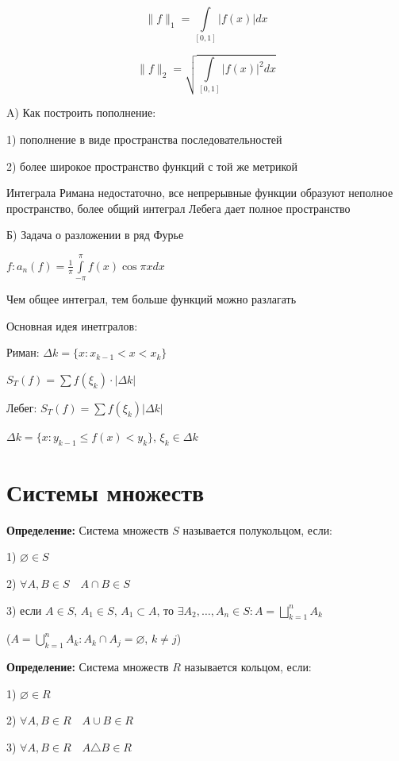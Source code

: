 \documentclass[a4paper]{report}
\begin{document}
$$\|f\|_1=\displaystyle\int\limits_{[0,1]}|f(x)|dx$$

$$\|f\|_2=\sqrt{\displaystyle\int\limits_{[0,1]}|f(x)|^2dx}$$

\noindent A) Как построить пополнение:

1) пополнение в виде пространства последовательностей

2) более широкое пространство функций с той же метрикой

Интеграла Римана недостаточно, все непрерывные функции образуют неполное пространство, более общий интеграл Лебега дает
полное пространство

\noindent Б) Задача о разложении в ряд Фурье

$f\colon a_n(f)=\frac1\pi\displaystyle\int\limits_{-\pi}^\pi f(x)\cos\pi x dx$

Чем общее интеграл, тем больше функций можно разлагать

\noindent Основная идея инетгралов:

Риман: $\Delta k=\{x\colon x_{k-1}<x<x_k\}$

$S_T(f)=\sum f(\xi_k)\cdot|\Delta k|$

Лебег: $S_T(f)=\sum f(\xi_k)|\Delta k|$

$\Delta k=\{x\colon y_{k-1}\le f(x)<y_k\}$, $\xi_k\in\Delta k$








\chapter{Системы множеств}

\noindent\textbf{Определение:} Система множеств $S$ называется полукольцом, если:

1) $\varnothing\in S$

2) $\forall A,B\in S\quad A\cap B\in S$

3) если $A\in S$, $A_1\in S$, $A_1\subset A$, то $\exists A_2,\ldots,A_n\in S\colon A=\bigsqcup\limits_{k=1}^n A_k$

($A=\bigcup\limits_{k=1}^n A_k\colon A_k\cap A_j=\varnothing$, $k\ne j$)
\bigskip

\noindent\textbf{Определение:} Система множеств $R$ называется кольцом, если:

1) $\varnothing\in R$

2) $\forall A,B\in R\quad A\cup B\in R$

3) $\forall A,B\in R\quad A\triangle B\in R$
\end{document}
